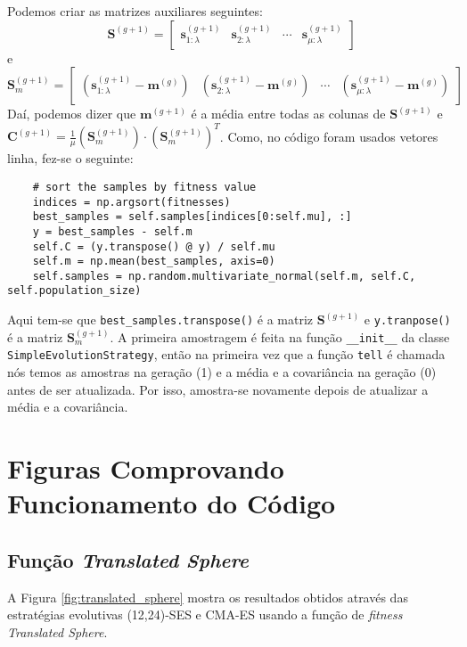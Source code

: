 \documentclass[brazil, 12pt]{article}
\begin{document}
Podemos criar as matrizes auxiliares seguintes:
\begin{equation}
	\mathbf{S}^{(g+1)}=\left[\begin{array}{cccc}
		\mathbf{s}_{1:\lambda}^{(g+1)}&
		\mathbf{s}_{2:\lambda}^{(g+1)}&
		\cdots&
		\mathbf{s}_{\mu:\lambda}^{(g+1)}
	\end{array}\right]
\end{equation}e
\begin{equation}
	\mathbf{S}_{m}^{(g+1)}=\left[\begin{array}{cccc}
		\left(\mathbf{s}_{1:\lambda}^{(g+1)} - \mathbf{m}^{(g)}\right)&
		\left(\mathbf{s}_{2:\lambda}^{(g+1)} - \mathbf{m}^{(g)}\right)&
		\cdots&
		\left(\mathbf{s}_{\mu:\lambda}^{(g+1)} - \mathbf{m}^{(g)}\right)
	\end{array}\right]
\end{equation}Daí, podemos dizer que $\mathbf{m}^{(g+1)}$ é a média entre todas as colunas de $\mathbf{S}^{(g+1)}$ e $\mathbf{C}^{(g+1)}=\frac{1}{\mu}(\mathbf{S}_{m}^{(g+1)})\cdot(\mathbf{S}_{m}^{(g+1)})^{T}$.
Como, no código foram usados vetores linha, fez-se o seguinte:

\begin{verbatim}
	# sort the samples by fitness value
	indices = np.argsort(fitnesses)
	best_samples = self.samples[indices[0:self.mu], :]
	y = best_samples - self.m
	self.C = (y.transpose() @ y) / self.mu
	self.m = np.mean(best_samples, axis=0)
	self.samples = np.random.multivariate_normal(self.m, self.C, self.population_size)
\end{verbatim}

Aqui tem-se que \texttt{best\_samples.transpose()} é a matriz $\mathbf{S}^{(g+1)}$ e \texttt{y.tranpose()} é a matriz $\mathbf{S}_{m}^{(g+1)}$. A primeira amostragem é feita na função \texttt{\_\_init\_\_} da classe \texttt{SimpleEvolutionStrategy}, então na primeira vez que a função \texttt{tell} é chamada nós temos as amostras na geração (1) e a média e a covariância na geração (0) antes de ser atualizada. Por isso, amostra-se novamente depois de atualizar a média e a covariância.

\section{Figuras Comprovando Funcionamento do Código}

\subsection{Função \emph{Translated Sphere}}
A Figura \ref{fig:translated_sphere} mostra os resultados obtidos através das estratégias evolutivas (12,24)-SES e CMA-ES usando a função de \textit{fitness Translated Sphere}.
\end{document}
